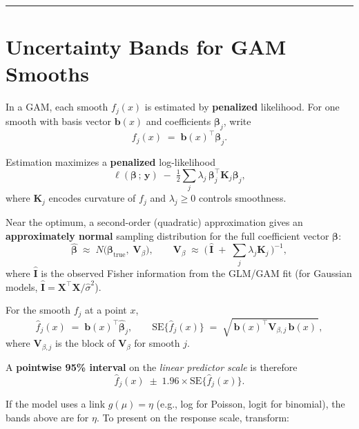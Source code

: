 \documentclass[
  letterpaper,
  DIV=11,
  numbers=noendperiod]{scrreprt}
\begin{document}
\begin{center}\rule{0.5\linewidth}{0.5pt}\end{center}

\hypertarget{uncertainty-bands-for-gam-smooths}{%
\section*{Uncertainty Bands for GAM
Smooths}\label{uncertainty-bands-for-gam-smooths}}


In a GAM, each smooth \(f_j(x)\) is estimated by \textbf{penalized}
likelihood. For one smooth with basis vector \(\mathbf{b}(x)\) and
coefficients \(\boldsymbol{\beta}_j\), write \[
f_j(x) \;=\; \mathbf{b}(x)^\top \boldsymbol{\beta}_j.
\]

Estimation maximizes a \textbf{penalized} log-likelihood \[
\ell(\boldsymbol{\beta}\,;\,\mathbf{y}) \;-\; \tfrac{1}{2}\sum_j \lambda_j\,\boldsymbol{\beta}_j^\top \mathbf{K}_j \boldsymbol{\beta}_j,
\] where \(\mathbf{K}_j\) encodes curvature of \(f_j\) and
\(\lambda_j \ge 0\) controls smoothness.

Near the optimum, a second-order (quadratic) approximation gives an
\textbf{approximately normal} sampling distribution for the full
coefficient vector \(\boldsymbol{\beta}\): \[
\hat{\boldsymbol{\beta}} \;\approx\; N\!\Big(\boldsymbol{\beta}_{\text{true}},\; \mathbf{V}_{\beta}\Big),
\qquad
\mathbf{V}_{\beta} \;\approx\; \big(\,\hat{\mathbf{I}} \;+\; \sum_j \lambda_j \mathbf{K}_j\,\big)^{-1},
\] where \(\hat{\mathbf{I}}\) is the observed Fisher information from
the GLM/GAM fit (for Gaussian models,
\(\hat{\mathbf{I}}=\mathbf{X}^\top \mathbf{X}/\hat{\sigma}^2\)).

For the smooth \(f_j\) at a point \(x\), \[
\hat{f}_j(x) \;=\; \mathbf{b}(x)^\top \hat{\boldsymbol{\beta}}_j,
\qquad
\mathrm{SE}\{\hat{f}_j(x)\} \;=\; \sqrt{\,\mathbf{b}(x)^\top \mathbf{V}_{\beta,j}\, \mathbf{b}(x)\,},
\] where \(\mathbf{V}_{\beta,j}\) is the block of \(\mathbf{V}_{\beta}\)
for smooth \(j\).

A \textbf{pointwise 95\% interval} on the \emph{linear predictor scale}
is therefore \[
\hat{f}_j(x) \;\pm\; 1.96 \times \mathrm{SE}\{\hat{f}_j(x)\}.
\]

If the model uses a link \(g(\mu)=\eta\) (e.g., log for Poisson, logit
for binomial), the bands above are for \(\eta\). To present on the
response scale, transform:
\end{document}
